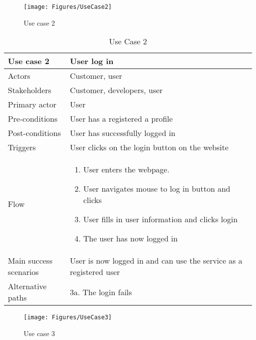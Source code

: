 \begin{figure}[H]
\centering
\texttt{[image: Figures/UseCase2]}
\caption{Use case 2}
    \label{fig:UC2}
    \end{figure}

\begin{table}[H]
\begin{tabular}{ | L{0.25\linewidth} | L{0.75\linewidth} | } 
 \hline {}
 Use case 2 & User log in  \\ 
 \hline
 Actors & Customer, user \\ 
 \hline
 Stakeholders & Customer, developers, user \\ 
  \hline
 Primary actor & User  \\ 
 \hline
 Pre-conditions & User has a registered a profile \\ 
 \hline
 Post-conditions & User has successfully logged in \\ 
  \hline
 Triggers & User clicks on the login button on the website  \\ 
 \hline
Flow & 
    \vspace{-5mm}
    \begin{enumerate}[noitemsep]
  \item User enters the webpage.
  \item User navigates mouse to log in button and clicks
  \item User fills in user information and clicks login
  \item The user has now logged in
   \end{enumerate}\\ 
 \hline
 Main success scenarios & User is now logged in and can use the service as a registered user \\ 
 \hline
 Alternative paths & 3a. The login fails\\
 \hline
\end{tabular}
\caption{Use Case 2}
\end{table}

\begin{figure}[H]
\centering
\texttt{[image: Figures/UseCase3]}
\caption{Use case 3}
    \label{fig:UC3}
    \end{figure}

